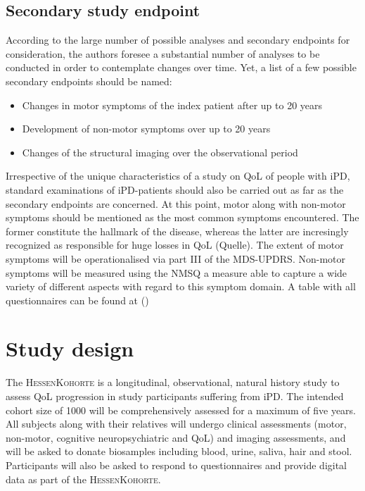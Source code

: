 \subsection{Secondary study endpoint}
According to the large number of possible analyses and secondary endpoints for consideration, the authors foresee a substantial
number of analyses to be conducted in order to contemplate changes over time. Yet, a list of a few possible secondary endpoints should be named:
\begin{itemize}
  \item{Changes in motor symptoms of the index patient after up to 20 years}
  \item{Development of non-motor symptoms over up to 20 years}
  \item{Changes of the structural imaging over the observational period} 
\end{itemize}
Irrespective of the unique characteristics of a study on \ac{QoL} of people with \ac{iPD}, standard examinations of \ac{iPD}-patients should also be carried out as far as the secondary endpoints are concerned. At this point, motor along with non-motor symptoms should be mentioned as the most common symptoms encountered. The former constitute the hallmark of the disease, whereas the latter are incresingly recognized as responsible for huge losses in \ac{QoL} (Quelle). The extent of motor symptoms will be operationalised via part III of the \ac{MDS-UPDRS}\cite{goetz2007updrs}. Non-motor symptoms will be measured using the \ac{NMSQ} a measure able to capture a wide variety of different aspects with regard to this symptom domain. A table with all questionnaires can be found at ()


\section{Study design}
The \textsc{HessenKohorte} is a longitudinal, observational, natural history study to assess \ac{QoL} progression in study participants suffering from \ac{iPD}. The intended cohort size of \num[round-precision = 0, round-mode = places]{1000}{} will be comprehensively assessed for a maximum of five years. All subjects along with their relatives will undergo clinical assessments (motor, non-motor, cognitive neuropsychiatric and \ac{QoL}) and imaging assessments, and will be asked to donate biosamples including blood, urine, saliva, hair and stool. Participants will also be asked to respond to questionnaires and provide digital data as part of the \textsc{HessenKohorte}.


